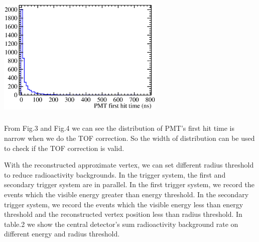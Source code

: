 \documentclass[a4paper,10pt,twoside]{paper}
\begin{document}
\begin{multicols}{2}
		\begin{center}
			\includegraphics[width=8cm,height=6cm]{4MeV_e+_PMT_first_hitTime_corrected.eps}
		\end{center}


		From Fig.3 and Fig.4 we can see the distribution of PMT's first hit time is narrow
		when we do the TOF correction. So the width of distribution can be used to check if 
		the TOF correction is valid.


		With the reconstructed approximate vertex, we can
		set different radius threshold to reduce radioactivity
		backgrounds. In the trigger system, the first and secondary trigger system are in parallel. 
		In the first trigger system, we record the events which the visible energy
		greater than energy threshold. In the secondary trigger system, 
		we record the events which the visible energy less than energy threshold 
		and the reconstructed vertex position less than radius threshold.
		In table.2 we show the central detector's sum radioactivity background rate
		on different energy and radius threshold.


	\end{multicols}
\end{document}

